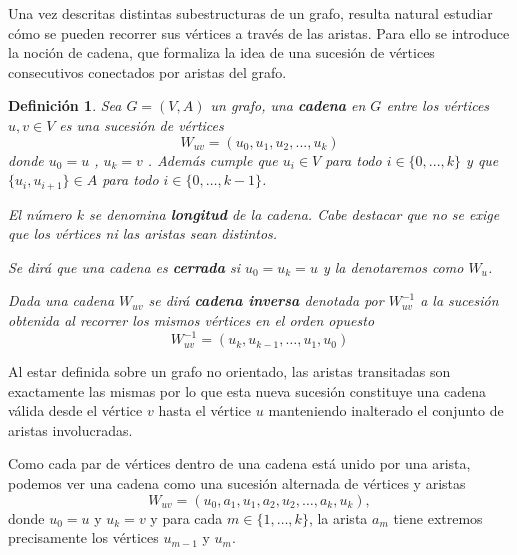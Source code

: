 \documentclass[11pt,a4paper,spanish]{report}
\theoremstyle{plain}
\newtheorem{definicion}{Definición}[chapter]
\begin{document}
Una vez descritas distintas subestructuras de un grafo, resulta natural
estudiar cómo se pueden recorrer sus vértices a través de las aristas.
Para ello se introduce la noción de cadena, que formaliza la idea de una
sucesión de vértices consecutivos conectados por aristas del grafo.

\begin{definicion}
Sea $G=(V,A)$ un grafo, una \textbf{cadena} en $G$ entre los vértices $u,v\in V$ es una sucesión  de vértices 
\[W_{uv}=(u_0,u_1,u_2,...,u_k)\]
donde $u_0=u$ , $u_k=v$ . Además cumple que  $u_i\in V$ para todo $ i\in \{0,...,k\}$ y que $\{u_{i},u_{i+1}\}\in A$ para todo $i\in \{0,\dots,k-1\}$.

El número $k$ se denomina \textbf{longitud} de la cadena. 
Cabe destacar que no se exige que los vértices ni las aristas sean distintos. 

Se dirá que una cadena es \textbf{cerrada} si $u_0 = u_k=u$ y la denotaremos como $W_u$. 

Dada una cadena $W_{uv}$ se dirá \textbf{cadena inversa} denotada por $W_{uv}^{-1}$ a la sucesión obtenida al recorrer los mismos vértices en el orden opuesto
\[
W_{uv}^{-1} = (u_k, u_{k-1}, \dots, u_1, u_0)
\]

\end{definicion}
Al estar definida sobre un grafo no orientado, las aristas transitadas son exactamente las mismas por lo que esta nueva sucesión constituye una cadena válida desde el vértice $v$ hasta el vértice $u$ manteniendo inalterado el conjunto de aristas involucradas.

Como cada par de vértices dentro de una cadena está unido por una arista, podemos ver una cadena como una sucesión alternada de vértices y aristas
\[
W_{uv} = (u_0,a_1,u_1,a_2,u_2, \dots ,a_k, u_k),
\]
donde $u_0=u$ y $u_k=v$ y para cada $m\in \{1,\dots,k\}$, la arista $a_m$ tiene extremos precisamente los vértices $u_{m-1}$ y $u_m$. 

\end{document}
